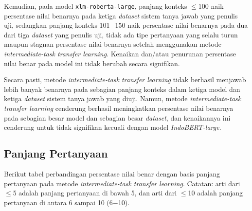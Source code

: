 Kemudian, pada model \texttt{xlm-roberta-large}, panjang konteks $\leq100$ naik persentase nilai benarnya pada ketiga \emph{dataset} sistem tanya jawab yang penulis uji, sedangkan panjang konteks 101$-$150 naik persentase nilai benarnya pada dua dari tiga \emph{dataset} yang penulis uji, tidak ada tipe pertanyaan yang selalu turun maupun stagnan persentase nilai benarnya setelah menggunakan metode \emph{intermediate-task transfer learning}. Kenaikan dan/atau penurunan persentase nilai benar pada model ini tidak berubah secara signifikan.

Secara pasti, metode \emph{intermediate-task transfer learning} tidak berhasil menjawab lebih banyak benarnya pada sebagian panjang konteks dalam ketiga model dan ketiga \emph{dataset} sistem tanya jawab yang diuji. Namun, metode \emph{intermediate-task transfer learning} cenderung berhasil meningkatkan persentase nilai benarnya pada sebagian besar model dan sebagian besar \emph{dataset}, dan kenaikannya ini cenderung untuk tidak signifikan kecuali dengan model \emph{IndoBERT-large}.

\subsection{Panjang Pertanyaan}
Berikut tabel perbandingan persentase nilai benar dengan basis panjang pertanyaan pada metode \emph{intermediate-task transfer learning}. Catatan: arti dari $\leq$5 adalah panjang pertanyaan di bawah 5, dan arti dari $\leq$10 adalah panjang pertanyaan di antara 6 sampai 10 (6$-$10).


